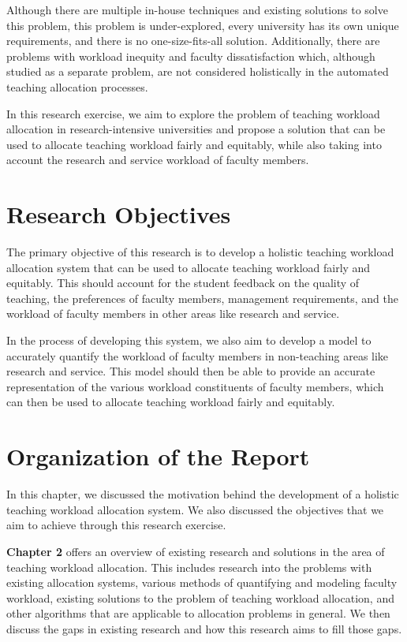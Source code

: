 Although there are multiple in-house techniques and existing solutions to solve this problem, this problem is under-explored, every university has its own unique requirements, and there is no one-size-fits-all solution. Additionally, there are problems with workload inequity and faculty dissatisfaction which, although studied as a separate problem, are not considered holistically in the automated teaching allocation processes.

In this research exercise, we aim to explore the problem of teaching workload allocation in research-intensive universities and propose a solution that can be used to allocate teaching workload fairly and equitably, while also taking into account the research and service workload of faculty members.

\section{Research Objectives}

The primary objective of this research is to develop a holistic teaching workload allocation system that can be used to allocate teaching workload fairly and equitably. This should account for the student feedback on the quality of teaching, the preferences of faculty members, management requirements, and the workload of faculty members in other areas like research and service.

In the process of developing this system, we also aim to develop a model to accurately quantify the workload of faculty members in non-teaching areas like research and service. This model should then be able to provide an accurate representation of the various workload constituents of faculty members, which can then be used to allocate teaching workload fairly and equitably.

\section{Organization of the Report}

In this chapter, we discussed the motivation behind the development of a holistic teaching workload allocation system. We also discussed the objectives that we aim to achieve through this research exercise.

\textbf{Chapter 2} offers an overview of existing research and solutions in the area of teaching workload allocation. This includes research into the problems with existing allocation systems, various methods of quantifying and modeling faculty workload, existing solutions to the problem of teaching workload allocation, and other algorithms that are applicable to allocation problems in general. We then discuss the gaps in existing research and how this research aims to fill those gaps.

